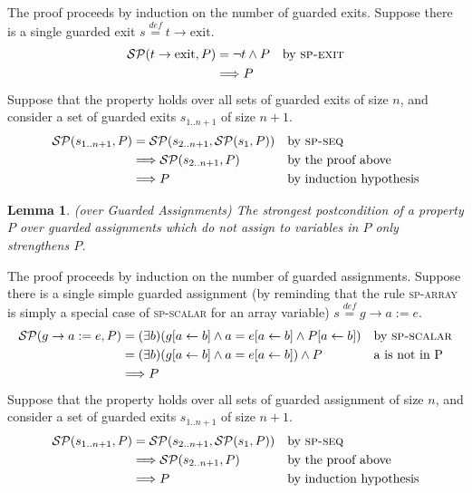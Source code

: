 \documentclass[a4paper,10pt]{article}
\newcommand{\KWexit}{\ensuremath{\mathrm{exit}}}
\newcommand{\impl}{\ensuremath{\Longrightarrow}}
\newcommand{\symdef}{\ensuremath{\overset{\mathit{def}}{=}}}
\newcommand{\spexit}{\textsc{sp-exit}\xspace}
\newcommand{\spscalar}{\textsc{sp-scalar}\xspace}
\newcommand{\sparray}{\textsc{sp-array}\xspace}
\newcommand{\spseq}{\textsc{sp-seq}\xspace}
\newtheorem{lemma}[theorem]{Lemma}
\newenvironment{proof}[1][Proof.]{\begin{trivlist}
\item[\hskip \labelsep {\bfseries #1}]}{\end{trivlist}}
\begin{document}
\begin{proof}
  The proof proceeds by induction on the number of guarded exits. Suppose there
  is a single guarded exit $s \symdef t \rightarrow \KWexit$.
  \begin{align*}
    \spost{t \rightarrow \KWexit}{P} 
    &= \neg t \land P && \text{by \spexit}\\
    &\impl P
  \end{align*}
  Suppose that the property holds over all sets of guarded exits of size $n$,
  and consider a set of guarded exits $s_{1..n+1}$ of size $n+1$.
  \begin{align*}
    \spost{s_{1..n+1}}{P} 
    &= \spost{s_{2..n+1}}{\spost{s_1}{P}}  && \text{by \spseq}\\
    &\impl \spost{s_{2..n+1}}{P}           && \text{by the proof above}\\
    &\impl P                             && \text{by induction hypothesis}\\
  \end{align*}
\end{proof}

\begin{lemma}
  \emph{(\spostsym over Guarded Assignments)} The strongest postcondition of a
  property $P$ over guarded assignments which do not assign to variables in $P$
  only strengthens $P$.
\label{lemma:sp-g-assignments}
\end{lemma}

\begin{proof}
  The proof proceeds by induction on the number of guarded assignments. Suppose there
  is a single simple guarded assignment (by reminding that the rule \sparray is simply 
  a special case of \spscalar for an array variable) $s \symdef g \rightarrow a := e$.
  \begin{align*}
    \spost{g \rightarrow a:=e}{P} 
    &= (\exists b) (\subst{g}{a}{b} 
    \land a = \subst{e}{a}{b} \land \subst{P}{a}{b}) && \text{by \spscalar}\\
    &= (\exists b) (\subst{g}{a}{b} 
    \land a = \subst{e}{a}{b}) \land P && \text{a is not in P}\\
    &\impl P
  \end{align*}
  Suppose that the property holds over all sets of guarded assignment of size $n$,
  and consider a set of guarded exits $s_{1..n+1}$ of size $n+1$.
  \begin{align*}
    \spost{s_{1..n+1}}{P} 
    &= \spost{s_{2..n+1}}{\spost{s_1}{P}}  && \text{by \spseq}\\
    &\impl \spost{s_{2..n+1}}{P}           && \text{by the proof above}\\
    &\impl P                             && \text{by induction hypothesis}\\
  \end{align*}
\end{proof}
\end{document}
